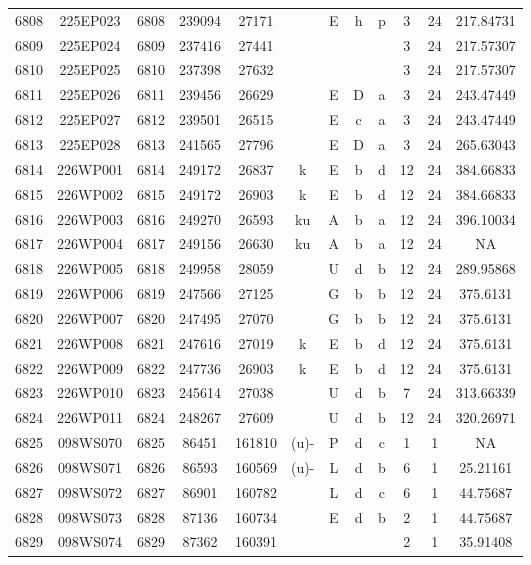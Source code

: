 \begin{tabular}{|*{12}{c|}}
6808 & 225EP023 & 6808 & 239094 & 27171 &  & E & h & p & 3 & 24 & 217.84731 \\ 
6809 & 225EP024 & 6809 & 237416 & 27441 &  &  &  &  & 3 & 24 & 217.57307 \\ 
6810 & 225EP025 & 6810 & 237398 & 27632 &  &  &  &  & 3 & 24 & 217.57307 \\ 
6811 & 225EP026 & 6811 & 239456 & 26629 &  & E & D & a & 3 & 24 & 243.47449 \\ 
6812 & 225EP027 & 6812 & 239501 & 26515 &  & E & c & a & 3 & 24 & 243.47449 \\ 
6813 & 225EP028 & 6813 & 241565 & 27796 &  & E & D & a & 3 & 24 & 265.63043 \\ 
6814 & 226WP001 & 6814 & 249172 & 26837 & k & E & b & d & 12 & 24 & 384.66833 \\ 
6815 & 226WP002 & 6815 & 249172 & 26903 & k & E & b & d & 12 & 24 & 384.66833 \\ 
6816 & 226WP003 & 6816 & 249270 & 26593 & ku & A & b & a & 12 & 24 & 396.10034 \\ 
6817 & 226WP004 & 6817 & 249156 & 26630 & ku & A & b & a & 12 & 24 & NA \\ 
6818 & 226WP005 & 6818 & 249958 & 28059 &  & U & d & b & 12 & 24 & 289.95868 \\ 
6819 & 226WP006 & 6819 & 247566 & 27125 &  & G & b & b & 12 & 24 & 375.6131 \\ 
6820 & 226WP007 & 6820 & 247495 & 27070 &  & G & b & b & 12 & 24 & 375.6131 \\ 
6821 & 226WP008 & 6821 & 247616 & 27019 & k & E & b & d & 12 & 24 & 375.6131 \\ 
6822 & 226WP009 & 6822 & 247736 & 26903 & k & E & b & d & 12 & 24 & 375.6131 \\ 
6823 & 226WP010 & 6823 & 245614 & 27038 &  & U & d & b & 7 & 24 & 313.66339 \\ 
6824 & 226WP011 & 6824 & 248267 & 27609 &  & U & d & b & 12 & 24 & 320.26971 \\ 
6825 & 098WS070 & 6825 & 86451 & 161810 & (u)- & P & d & c & 1 & 1 & NA \\ 
6826 & 098WS071 & 6826 & 86593 & 160569 & (u)- & L & d & b & 6 & 1 & 25.21161 \\ 
6827 & 098WS072 & 6827 & 86901 & 160782 &  & L & d & c & 6 & 1 & 44.75687 \\ 
6828 & 098WS073 & 6828 & 87136 & 160734 &  & E & d & b & 2 & 1 & 44.75687 \\ 
6829 & 098WS074 & 6829 & 87362 & 160391 &  &  &  &  & 2 & 1 & 35.91408 \\ 

\end{tabular}
